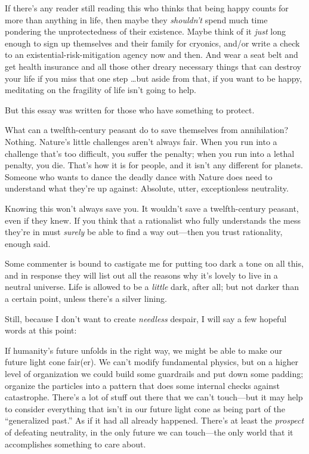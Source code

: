 {
 If there's any reader still reading this who
thinks that being happy counts for more than anything in life, then
maybe they \textit{shouldn't} spend much time pondering
the unprotectedness of their existence. Maybe think of it \textit{just}
long enough to sign up themselves and their family for cryonics, and/or
write a check to an existential-risk-mitigation agency now and then.
And wear a seat belt and get health insurance and all those other
dreary necessary things that can destroy your life if you miss that one
step \ldots but aside from that, if you want to be happy, meditating on
the fragility of life isn't going to help.}

{
 But this essay was written for those who have something to
protect.}

{
 What can a twelfth-century peasant do to save themselves from
annihilation? Nothing. Nature's little challenges
aren't always fair. When you run into a challenge
that's too difficult, you suffer the penalty; when you
run into a lethal penalty, you die. That's how it is
for people, and it isn't any different for planets.
Someone who wants to dance the deadly dance with Nature does need to
understand what they're up against: Absolute, utter,
exceptionless neutrality.}

{
 Knowing this won't always save you. It
wouldn't save a twelfth-century peasant, even if they
knew. If you think that a rationalist who fully understands the mess
they're in must \textit{surely} be able to find a way
out---then you trust rationality, enough said.}

{
 Some commenter is bound to castigate me for putting too dark a
tone on all this, and in response they will list out all the reasons
why it's lovely to live in a neutral universe. Life is
allowed to be a \textit{little} dark, after all; but not darker than a
certain point, unless there's a silver lining.}

{
 Still, because I don't want to create
\textit{needless} despair, I will say a few hopeful words at this
point:}

{
 If humanity's future unfolds in the right way, we
might be able to make our future light cone fair(er). We
can't modify fundamental physics, but on a higher level
of organization we could build some guardrails and put down some
padding; organize the particles into a pattern that does some internal
checks against catastrophe. There's a lot of stuff out
there that we can't touch---but it may help to consider
everything that isn't in our future light cone as being
part of the ``generalized past.'' As
if it had all already happened. There's at least the
\textit{prospect} of defeating neutrality, in the only future we can
touch---the only world that it accomplishes something to care about.}

